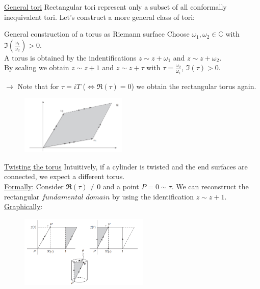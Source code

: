 \documentclass[11pt,aspectratio=169]{beamer}
\begin{document}
\begin{frame}{\underline{General tori}}
	Rectangular tori represent only a subset of all conformally inequivalent tori. Let's construct a more general class of tori:
	\\
	\begin{block}{General construction of a torus as Riemann surface}
		Choose $\omega_1, \omega_2 \in \mathbb{C}$ with $\Im(\frac{\omega_1}{\omega_2}) > 0$.
		\\
		A torus is obtained by the indentifications $z \sim z + \omega_1$ and $z \sim z + \omega_2$.
		\\
		By scaling we obtain $z \sim z + 1$ and $z \sim z + \tau$ with $\tau = \frac{\omega_2}{\omega_1}$, $\Im(\tau) >0$.
	\end{block}
	$\rightarrow$ Note that for $\tau = iT$ ($\Leftrightarrow \Re(\tau) = 0$) we obtain the rectangular torus again.
	\begin{figure}[htbp]
		\centering
		\includegraphics[width = 0.45\textwidth]{elements/general torus.PNG}
	\end{figure}
\end{frame}

\begin{frame}{\underline{Twisting the torus}}
	Intuitively, if a cylinder is twisted and the end surfaces are connected, we expect a different torus. 
	\\
	\underline{Formally}: Consider $\Re(\tau) \neq 0$ and a point $P = 0 \sim \tau$. We can reconstruct the rectangular $\textit{fundamental domain}$ by using the identification $z \sim z + 1$.
	\\
	\underline{Graphically}:
	\begin{figure}[htbp]
		\centering
		\includegraphics[width = 0.55\textwidth]{elements/twisted torus.PNG}
	\end{figure}
	
\end{frame}
\end{document}
